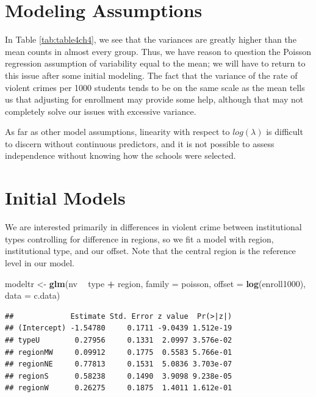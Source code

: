 \documentclass[
]{krantz}
\newenvironment{Shaded}{\begin{snugshade}}{\end{snugshade}}
\newcommand{\DataTypeTok}[1]{\textcolor[rgb]{0.27,0.27,0.27}{#1}}
\newcommand{\KeywordTok}[1]{\textcolor[rgb]{0.27,0.27,0.27}{\textbf{#1}}}
\newcommand{\NormalTok}[1]{#1}
\newcommand{\OperatorTok}[1]{\textcolor[rgb]{0.43,0.43,0.43}{\textbf{#1}}}
\newcommand{\StringTok}[1]{\textcolor[rgb]{0.5,0.5,0.5}{#1}}
\begin{document}
\hypertarget{modeling-assumptions}{%
\section{Modeling Assumptions}\label{modeling-assumptions}}

In Table \ref{tab:table4ch4}, we see that the variances are greatly higher than the mean counts in almost every group. Thus, we have reason to question the Poisson regression assumption of variability equal to the mean; we will have to return to this issue after some initial modeling. The fact that the variance of the rate of violent crimes per 1000 students tends to be on the same scale as the mean tells us that adjusting for enrollment may provide some help, although that may not completely solve our issues with excessive variance.

As far as other model assumptions, linearity with respect to \(log(\lambda)\) is difficult to discern without continuous predictors, and it is not possible to assess independence without knowing how the schools were selected.

\hypertarget{initial-models}{%
\section{Initial Models}\label{initial-models}}

We are interested primarily in differences in violent crime between institutional types controlling for difference in regions, so we fit a model with region, institutional type, and our offset. Note that the central region is the reference level in our model.

\begin{Shaded}
\begin{Highlighting}[]
\NormalTok{modeltr <-}\StringTok{ }\KeywordTok{glm}\NormalTok{(nv }\OperatorTok{~}\StringTok{ }\NormalTok{type }\OperatorTok{+}\StringTok{ }\NormalTok{region, }\DataTypeTok{family =}\NormalTok{ poisson,}
               \DataTypeTok{offset =} \KeywordTok{log}\NormalTok{(enroll1000), }\DataTypeTok{data =}\NormalTok{ c.data)}
\end{Highlighting}
\end{Shaded}

\begin{verbatim}
##             Estimate Std. Error z value  Pr(>|z|)
## (Intercept) -1.54780     0.1711 -9.0439 1.512e-19
## typeU        0.27956     0.1331  2.0997 3.576e-02
## regionMW     0.09912     0.1775  0.5583 5.766e-01
## regionNE     0.77813     0.1531  5.0836 3.703e-07
## regionS      0.58238     0.1490  3.9098 9.238e-05
## regionW      0.26275     0.1875  1.4011 1.612e-01
\end{verbatim}
\end{document}
